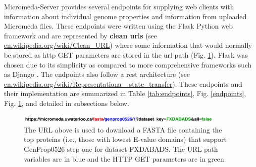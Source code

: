 Micromeda-Server provides several endpoints for supplying web clients with information about individual genome properties and information from uploaded Micromeda files. These endpoints were written using the Flask Python web framework \cite{grinberg2018flask} and are represented by \textbf{clean \gls{url}s} (see \href{http://en.wikipedia.org/wiki/Clean_URL}{en.wikipedia.org/wiki/Clean\_URL}) where some information that would normally be stored as \gls{http} GET parameters are stored in the \gls{url} path (Fig. \ref{fig:endpoint-url}). Flask was chosen due to its simplicity as compared to more comprehensive frameworks such as Django \cite{holovaty2009definitive}. The endpoints also follow a \gls{rest} architecture \cite{fielding2000representational} (see \href{http://en.wikipedia.org/wiki/Representational_state_transfer}{en.wikipedia.org/wiki/Representationa \_state\_transfer}). These endpoints and their implementation are summarized in Table \ref{tab:endpoints}, Fig. \ref{endpoints}, Fig. \ref{fig:endpoint-url}, and detailed in subsections below.

\begin{figure}[!ht]
  \centering
	\includegraphics[width=0.9\textwidth]{media/Coloured-Endpoint.pdf}
	 \caption{The URL above is used to download a FASTA file containing the top proteins (i.e., those with lowest E-value domains) that support GenProp0526 step one for dataset FXDABADS. The URL path variables are in blue and the HTTP GET parameters are in green.}
	 \label{fig:endpoint-url}
\end{figure}

\cleardoublepage

